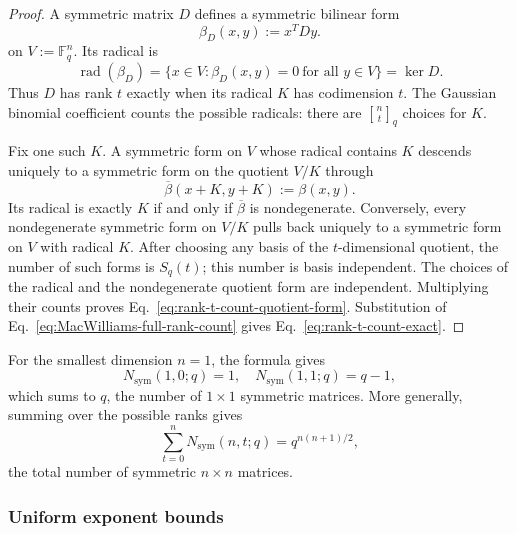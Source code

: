 \documentclass[11pt]{article}
\newcommand{\F}{\mathbb F}
\newcommand{\1}{\mathbf 1}
\theoremstyle{plain}
\theoremstyle{definition}
\theoremstyle{remark}
\begin{document}
\begin{proof}
A symmetric matrix $D$ defines a symmetric bilinear form
\begin{equation}
  \beta_D(x,y):=x^TDy.
  \label{eq:bilinear-form-from-matrix}
\end{equation}
on $V:=\F_q^n$.  Its radical is
\begin{equation}
  \operatorname{rad}(\beta_D)
  =\{x\in V:\beta_D(x,y)=0\ \text{for all }y\in V\}
  =\ker D.
  \label{eq:radical-equals-kernel}
\end{equation}
Thus $D$ has rank $t$ exactly when its radical $K$ has codimension $t$.  The
Gaussian binomial coefficient counts the possible radicals:
there are $\genfrac{[}{]}{0pt}{}{n}{t}_q$ choices for $K$.

Fix one such $K$.  A symmetric form on $V$ whose radical contains $K$ descends
uniquely to a symmetric form on the quotient $V/K$ through
\begin{equation}
  \overline\beta(x+K,y+K):=\beta(x,y).
  \label{eq:form-descends-to-quotient}
\end{equation}
Its radical is exactly $K$ if and only if $\overline\beta$ is nondegenerate.
Conversely, every nondegenerate symmetric form on $V/K$ pulls back uniquely to
a symmetric form on $V$ with radical $K$.  After choosing any basis of the
$t$-dimensional quotient, the number of such forms is $S_q(t)$; this number is
basis independent.  The choices of the radical and the nondegenerate quotient form are independent.
Multiplying their counts proves
Eq.~\eqref{eq:rank-t-count-quotient-form}.  Substitution of
Eq.~\eqref{eq:MacWilliams-full-rank-count} gives
Eq.~\eqref{eq:rank-t-count-exact}.
\end{proof}

For the smallest dimension $n=1$, the formula gives
\begin{equation}
  N_{\mathrm{sym}}(1,0;q)=1,
  \quad
  N_{\mathrm{sym}}(1,1;q)=q-1,
  \label{eq:rank-count-n-one-check}
\end{equation}
which sums to $q$, the number of $1\times1$ symmetric matrices.  More
generally, summing over the possible ranks gives
\begin{equation}
  \sum_{t=0}^nN_{\mathrm{sym}}(n,t;q)
  =q^{n(n+1)/2},
  \label{eq:rank-count-sums-to-all-symmetric}
\end{equation}
the total number of symmetric $n\times n$ matrices.

\subsubsection{Uniform exponent bounds}
\label{appsubsec:uniform-rank-exponent}
\end{document}

